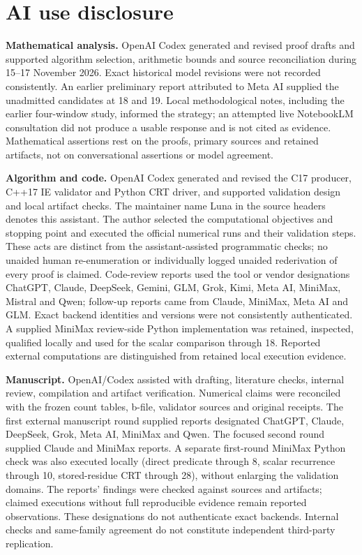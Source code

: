 \documentclass[11pt]{article}
\theoremstyle{definition}
\theoremstyle{remark}
\begin{document}
\section*{AI use disclosure}

\begingroup\small\setlength{\baselineskip}{11pt}
\noindent\textbf{Mathematical analysis.}
OpenAI Codex generated and revised proof drafts and supported algorithm
selection, arithmetic bounds and source reconciliation during
15--17 November 2026. Exact historical model revisions were not recorded
consistently. An earlier preliminary report
attributed to Meta AI supplied the unadmitted candidates at 18 and 19.
Local methodological notes, including the earlier four-window study, informed
the strategy; an attempted live NotebookLM consultation did not produce a
usable response and is not cited as evidence. Mathematical assertions rest
on the proofs, primary sources and retained artifacts, not on conversational
assertions or model agreement.

\smallskip
\noindent\textbf{Algorithm and code.}
OpenAI Codex generated and revised the C17 producer, C++17 IE validator
and Python CRT driver, and supported validation design and local artifact
checks. The maintainer name Luna in the source headers denotes this
assistant. The author selected the computational objectives and stopping
point and executed the official numerical runs and their validation steps.
These acts are distinct from the assistant-assisted programmatic checks;
no unaided human re-enumeration or individually logged unaided rederivation
of every proof is claimed. Code-review reports
used the tool or vendor designations ChatGPT, Claude, DeepSeek, Gemini,
GLM, Grok, Kimi, Meta AI, MiniMax, Mistral and Qwen; follow-up reports
came from Claude, MiniMax, Meta AI and GLM. Exact backend identities and
versions were not consistently authenticated. A supplied MiniMax review-side
Python implementation was retained, inspected, qualified locally and used
for the scalar comparison through 18. Reported external computations are
distinguished from retained local execution evidence.

\smallskip
\noindent\textbf{Manuscript.}
OpenAI/Codex assisted with drafting, literature checks, internal review,
compilation and artifact verification. Numerical claims were reconciled with
the frozen count tables, b-file, validator sources and original receipts.
The first external manuscript round supplied reports designated ChatGPT,
Claude, DeepSeek, Grok, Meta AI, MiniMax and Qwen. The focused second round
supplied Claude and MiniMax reports. A separate first-round MiniMax Python
check was also executed locally (direct predicate through 8, scalar recurrence
through 10, stored-residue CRT through 28), without enlarging the validation
domains. The reports' findings were
checked against sources and artifacts; claimed executions without full
reproducible evidence remain reported observations. These designations do
not authenticate exact backends. Internal checks and same-family agreement
do not constitute independent third-party replication.
\end{document}
